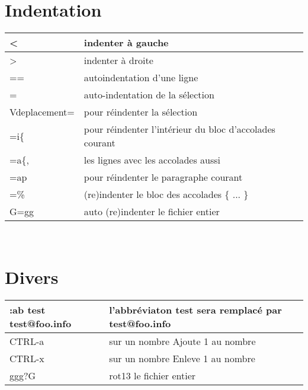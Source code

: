 \documentclass{article}
\begin{document}
\section{Indentation}
\begin{tabular}{|p{3cm}| l| }
\hline
< & indenter à gauche\\ \hline
> & indenter à droite\\ \hline
== & autoindentation d'une ligne\\ \hline
= & auto-indentation de la sélection\\ \hline
V{deplacement}= & pour réindenter la sélection\\ \hline
=i\{ & pour réindenter l'intérieur du bloc d'accolades courant\\ \hline
=a\{, & les lignes avec les accolades aussi\\ \hline
=ap & pour réindenter le paragraphe courant\\ \hline
=\% & (re)indenter le bloc des accolades \{ ... \} \\ \hline
G=gg   & auto (re)indenter le fichier entier \\ \hline
\end{tabular}\\




\section{Divers}
\begin{tabular}{|p{4cm}| l| }
\hline
:ab test test@foo.info & l'abbréviaton test sera remplacé par test@foo.info \\ \hline
    CTRL-a &sur un nombre Ajoute 1 au nombre \\ \hline
    CTRL-x &sur un nombre Enleve 1 au nombre \\ \hline
    ggg?G   & rot13 le fichier entier \\ \hline
\end{tabular}\\
\end{document}
